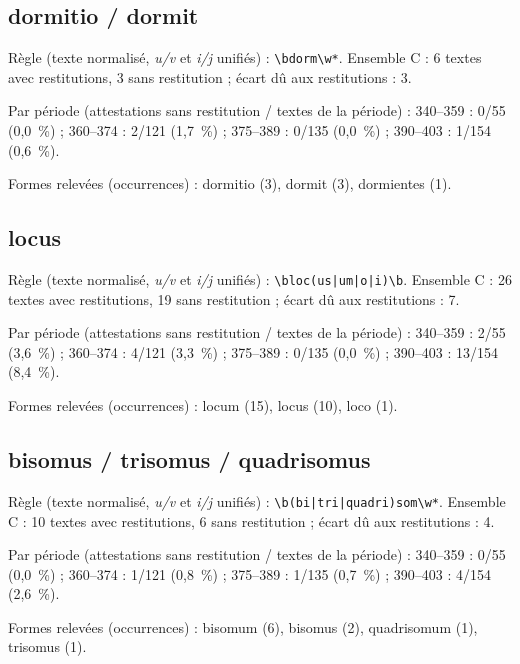 \subsection*{dormitio / dormit}
\noindent Règle (texte normalisé, \textit{u/v} et \textit{i/j} unifiés) : \texttt{\small \textbackslash{}bdorm\textbackslash{}w*}. Ensemble C : 6 textes avec restitutions, 3 sans restitution ; écart dû aux restitutions : 3.\par
\noindent Par période (attestations sans restitution / textes de la période) : 340–359 : 0/55 (0,0~\%) ; 360–374 : 2/121 (1,7~\%) ; 375–389 : 0/135 (0,0~\%) ; 390–403 : 1/154 (0,6~\%).\par
\noindent Formes relevées (occurrences) : dormitio (3), dormit (3), dormientes (1).\par
{}\par\medskip
\subsection*{locus}
\noindent Règle (texte normalisé, \textit{u/v} et \textit{i/j} unifiés) : \texttt{\small \textbackslash{}bloc(\allowbreak{}us|\allowbreak{}um|\allowbreak{}o|\allowbreak{}i)\textbackslash{}b}. Ensemble C : 26 textes avec restitutions, 19 sans restitution ; écart dû aux restitutions : 7.\par
\noindent Par période (attestations sans restitution / textes de la période) : 340–359 : 2/55 (3,6~\%) ; 360–374 : 4/121 (3,3~\%) ; 375–389 : 0/135 (0,0~\%) ; 390–403 : 13/154 (8,4~\%).\par
\noindent Formes relevées (occurrences) : locum (15), locus (10), loco (1).\par
{}\par\medskip
\subsection*{bisomus / trisomus / quadrisomus}
\noindent Règle (texte normalisé, \textit{u/v} et \textit{i/j} unifiés) : \texttt{\small \textbackslash{}b(\allowbreak{}bi|\allowbreak{}tri|\allowbreak{}quadri)som\textbackslash{}w*}. Ensemble C : 10 textes avec restitutions, 6 sans restitution ; écart dû aux restitutions : 4.\par
\noindent Par période (attestations sans restitution / textes de la période) : 340–359 : 0/55 (0,0~\%) ; 360–374 : 1/121 (0,8~\%) ; 375–389 : 1/135 (0,7~\%) ; 390–403 : 4/154 (2,6~\%).\par
\noindent Formes relevées (occurrences) : bisomum (6), bisomus (2), quadrisomum (1), trisomus (1).\par
{}\par\medskip
